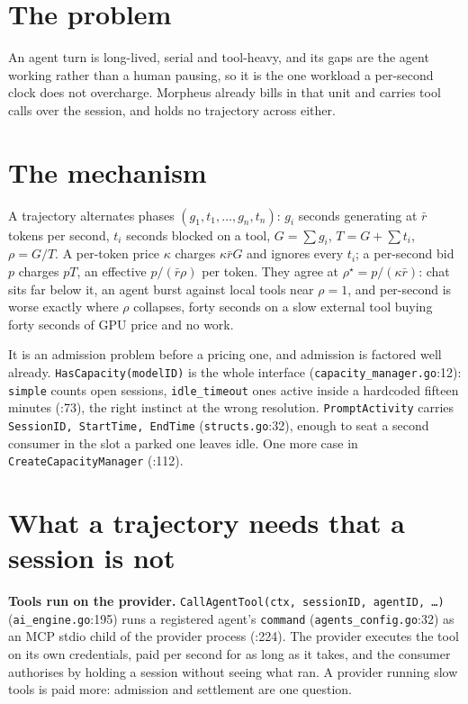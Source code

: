 \documentclass[10pt,a4paper]{article}
\begin{document}
\sloppy


\section*{The problem}

An agent turn is long-lived, serial and tool-heavy, and its gaps are the agent working rather than
a human pausing, so it is the one workload a per-second clock does not overcharge. Morpheus already
bills in that unit and carries tool calls over the session, and holds no trajectory across either.

\section*{The mechanism}

A trajectory alternates phases $(g_1,t_1,\dots,g_n,t_n)$: $g_i$ seconds generating at
$\bar r$ tokens per second, $t_i$ seconds blocked on a tool, $G=\sum g_i$, $T=G+\sum t_i$,
$\rho=G/T$. A per-token price $\kappa$ charges $\kappa\bar rG$ and ignores every $t_i$; a
per-second bid $p$ charges $pT$, an effective $p/(\bar r\rho)$ per token. They agree at
$\rho^{\star}=p/(\kappa\bar r)$: chat sits far below it, an agent burst against local tools near
$\rho=1$, and per-second is worse exactly where $\rho$ collapses, forty seconds on a slow external
tool buying forty seconds of GPU price and no work.

It is an admission problem before a pricing one, and admission is factored well already.
\texttt{HasCapacity(modelID)} is the whole interface (\texttt{capacity\_manager.go}:12):
\texttt{simple} counts open sessions, \texttt{idle\_timeout} ones active inside a hardcoded fifteen
minutes (:73), the right instinct at the wrong resolution. \texttt{PromptActivity} carries \texttt{SessionID,
StartTime, EndTime} (\texttt{structs.go}:32), enough to seat a second consumer in the slot a parked
one leaves idle. One more case in \texttt{CreateCapacityManager} (:112).

\section*{What a trajectory needs that a session is not}

\textbf{Tools run on the provider.} \texttt{CallAgentTool(ctx, sessionID, agentID, \dots)}
(\texttt{ai\_engine.go}:195) runs a registered agent's \texttt{command}
(\texttt{agents\_config.go}:32) as an MCP stdio child of the provider process (:224). The provider
executes the tool on its own credentials, paid per second for as long as it takes, and the consumer
authorises by holding a session without seeing what ran. A provider running slow tools is paid
more: admission and settlement are one question.
\end{document}
